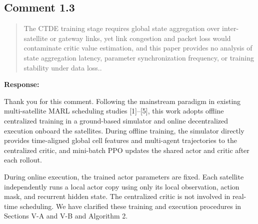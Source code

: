 \documentclass[11pt,a4paper]{article}
\begin{document}
\subsection*{Comment 1.3}

\begin{quote}\small The CTDE training stage requires global state aggregation over inter-satellite or gateway links, yet link congestion and packet loss would contaminate critic value estimation, and this paper provides no analysis of state aggregation latency, parameter synchronization frequency, or training stability under data loss..\end{quote}

\textbf{Response:}\par

Thank you for this comment. Following the mainstream paradigm in existing multi-satellite MARL scheduling studies [1]--[5], this work adopts offline centralized training in a ground-based simulator and online decentralized execution onboard the satellites. During offline training, the simulator directly provides time-aligned global cell features and multi-agent trajectories to the centralized critic, and mini-batch PPO updates the shared actor and critic after each rollout.
\par

During online execution, the trained actor parameters are fixed. Each satellite independently runs a local actor copy using only its local observation, action mask, and recurrent hidden state. The centralized critic is not involved in real-time scheduling. We have clarified these training and execution procedures in Sections V-A and V-B and Algorithm 2.
\par
\end{document}
